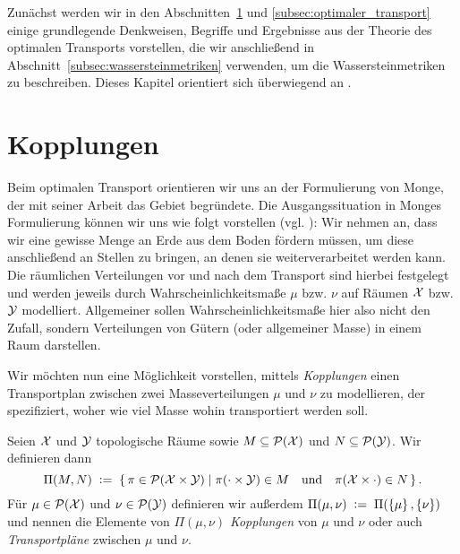 \documentclass[../thesis/thesis.tex]{subfiles}
\begin{document}
	Zunächst werden wir in den Abschnitten~\ref{subsec:kopplungen} und \ref{subsec:optimaler_transport} einige grundlegende Denkweisen, Begriffe und Ergebnisse aus der Theorie des optimalen Transports vorstellen,
	die wir anschließend in Abschnitt~\ref{subsec:wassersteinmetriken} verwenden, um die Wassersteinmetriken zu beschreiben. Dieses Kapitel orientiert sich überwiegend an \cite[Chapter 4-6]{Villani.2009}.
	
	\section{Kopplungen}
	\label{subsec:kopplungen}
	
	Beim optimalen Transport orientieren wir uns an der Formulierung von Monge, der mit seiner Arbeit \cite{Monge.} das Gebiet begründete.  
	Die Ausgangssituation in Monges Formulierung können wir uns wie folgt vorstellen (vgl. \cite[S. 41-42]{Villani.2009}):
	Wir nehmen an, dass wir eine gewisse Menge an Erde aus dem Boden fördern müssen, um diese anschließend an Stellen zu bringen, an denen sie weiterverarbeitet werden kann. Die räumlichen Verteilungen vor und
	nach dem Transport sind hierbei festgelegt und werden jeweils durch Wahrscheinlichkeitsmaße $\mu$ bzw. $\nu$ auf Räumen $\mathcal{X}$ bzw. $\mathcal{Y}$ modelliert. 
	Allgemeiner sollen Wahrscheinlichkeitsmaße hier also nicht den Zufall, sondern Verteilungen von Gütern (oder allgemeiner Masse) in einem Raum darstellen.
	
	
	
	Wir möchten nun eine Möglichkeit vorstellen, mittels \emph{Kopplungen} einen Transportplan zwischen zwei Masseverteilungen $\mu$ und $\nu$ zu modellieren, der spezifiziert, woher wie viel Masse wohin transportiert werden soll.
	
	\begin{Definition}[Kopplung]
		Seien $\mathcal{X}$ und $\mathcal{Y}$ topologische Räume sowie $M \subseteq \mathcal{P}(\mathcal{X})$ und $N \subseteq \mathcal{P}(\mathcal{Y})$. Wir definieren dann
		\[ \Pi(M, N) \; \vcentcolon = \; \left\{\, \pi \in \mathcal{P}(\mathcal{X} \times \mathcal{Y}) \; \middle| \; \pi(\cdot \times \mathcal{Y}) \in M \quad \text{und} \quad \pi(\mathcal{X} \times \cdot) \in N \,\right\} \text{.}\]
		Für $\mu \in \mathcal{P}(\mathcal{X})$ und $\nu \in \mathcal{P}(\mathcal{Y})$ definieren wir außerdem $\Pi(\mu, \nu) \; \vcentcolon = \; \Pi(\left\{\mu\right\}, \left\{\nu\right\})$ und nennen die
		Elemente von $\Pi(\mu, \nu)$ \emph{Kopplungen} von $\mu$ und $\nu$ oder auch \emph{Transportpläne} zwischen $\mu$ und $\nu$.
	\end{Definition}
\end{document}
